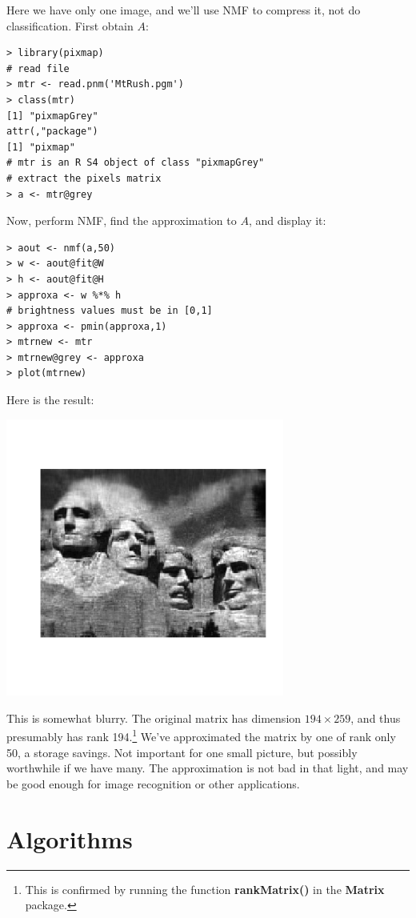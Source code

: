 Here we have only one image, and we'll use NMF to compress it, not do
classification.  First obtain $A$:

\begin{lstlisting}
> library(pixmap) 
# read file
> mtr <- read.pnm('MtRush.pgm') 
> class(mtr)
[1] "pixmapGrey"
attr(,"package")
[1] "pixmap"
# mtr is an R S4 object of class "pixmapGrey"
# extract the pixels matrix
> a <- mtr@grey
\end{lstlisting}

Now, perform NMF, find the approximation to $A$, and display it:

\begin{lstlisting}
> aout <- nmf(a,50)
> w <- aout@fit@W
> h <- aout@fit@H
> approxa <- w %*% h
# brightness values must be in [0,1]
> approxa <- pmin(approxa,1) 
> mtrnew <- mtr
> mtrnew@grey <- approxa 
> plot(mtrnew) 
\end{lstlisting}

Here is the result:

\includegraphics[width=3.6in]{Images/MtRush50.png}

This is somewhat blurry.  The original matrix has dimension $194
\times 259$, and thus presumably has rank 194.\footnote{This is
confirmed by running the function {\bf rankMatrix()} in the {\bf Matrix}
package.} We've approximated the matrix by one of rank only 50, a
storage savings.  Not important for one small picture, but possibly
worthwhile if we have many. The approximation is not bad in that light,
and may be good enough for image recognition or other applications.

\section{Algorithms}


